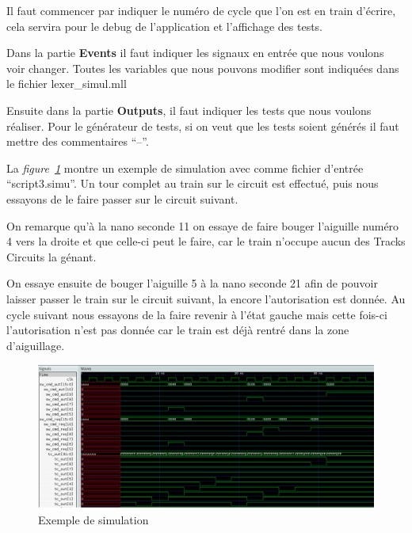 \medskip

Il faut commencer par indiquer le numéro de cycle que l'on est en train
d'écrire, cela servira pour le debug de l'application et l'affichage
des tests.

\medskip

Dans la partie \textbf{Events} il faut indiquer les signaux en entrée que nous
voulons voir changer. Toutes les variables que nous pouvons modifier
sont indiquées dans le fichier lexer\_simul.mll 

\medskip

Ensuite dans la partie \textbf{Outputs}, il faut indiquer les tests
que nous voulons réaliser.
Pour le générateur de tests, si on veut que les tests soient générés il
faut mettre des commentaires ``--''.

\bigskip

La \emph{figure~\ref{simul}}  montre un exemple de simulation avec comme
fichier d'entrée ``script3.simu''.
Un tour complet au train sur le circuit est effectué, puis nous
essayons de le faire passer sur le circuit suivant.

On remarque qu'à la nano seconde 11 on essaye de faire bouger
l'aiguille numéro 4 vers la droite et que celle-ci peut le faire, car le train
n'occupe aucun des Tracks Circuits la génant.

On essaye ensuite de bouger l'aiguille 5 à la nano seconde 21 afin de
pouvoir laisser passer le train sur le circuit suivant, la encore
l'autorisation est donnée.
Au cycle suivant nous essayons de la faire revenir à l'état
gauche mais cette fois-ci l'autorisation n'est pas donnée car le train est déjà
rentré dans la zone d'aiguillage.

\newpage

\begin{figure}[h]
\centering
\includegraphics[scale=0.36]{chrono.png}
\caption{Exemple de simulation}
\label{simul}
\end{figure}

